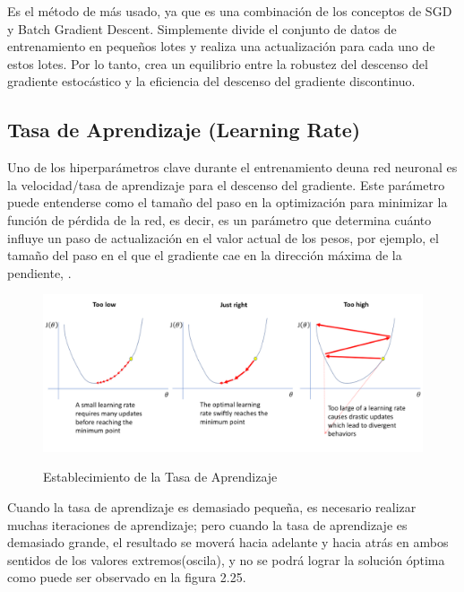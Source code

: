 			Es el método de más usado, ya que es una combinación de los conceptos de SGD y Batch Gradient Descent. Simplemente divide el conjunto de datos de entrenamiento en pequeños lotes y realiza una actualización para cada uno de estos lotes. Por lo tanto, crea un equilibrio entre la robustez del descenso del gradiente estocástico y la eficiencia del descenso del gradiente discontinuo.





	\subsection{Tasa de Aprendizaje (Learning Rate)}
		Uno de los hiperparámetros clave durante el entrenamiento deuna red neuronal es la velocidad/tasa de aprendizaje para el descenso del gradiente.
		Este parámetro puede entenderse como el tamaño del paso en la optimización para minimizar la función de pérdida de la red, es decir, es un parámetro que determina cuánto influye un paso de actualización en el valor actual de los pesos, por ejemplo, el tamaño del paso en el que el gradiente cae en la dirección máxima de la pendiente, \citep {AdamImg}.

		\begin{figure}[H]
		\includegraphics[width=1\textwidth]{images/desarrollo/entrenamiento/LR}
		\begin{center}
		\caption{\small{Establecimiento de la Tasa de Aprendizaje}}
		\vspace{-0.5em}
		{\small{\citep {AdamImg}}}
		\end{center}
		\vspace{-1.5em}
		\end{figure}

		Cuando la tasa de aprendizaje es demasiado pequeña, es necesario realizar muchas iteraciones de aprendizaje; pero cuando la tasa de aprendizaje es demasiado grande, el resultado se moverá hacia adelante y hacia atrás en ambos sentidos de los valores extremos(oscila), y no se podrá lograr la solución óptima como puede ser observado en la figura 2.25.

